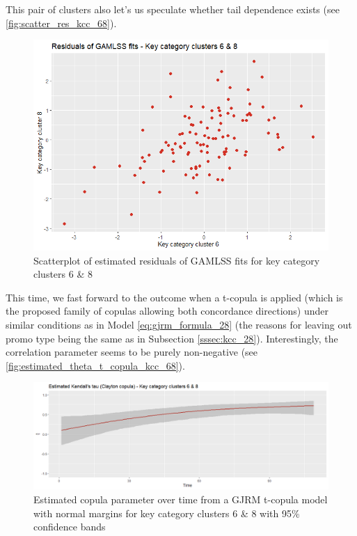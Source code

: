 


This pair of clusters also let's us speculate whether tail dependence exists (see \autoref{fig:scatter_res_kcc_68}).
\\


\begin{figure}[H]
\centering
  \includegraphics[width=0.45\linewidth]{figures/scatter_res_kcc_68.png}
  \caption{Scatterplot of estimated residuals of GAMLSS fits for key category clusters 6 \& 8}
  \label{fig:scatter_res_kcc_68}
\end{figure}


This time, we fast forward to the outcome when a t-copula is applied (which is the proposed family of copulas allowing both concordance directions) under similar conditions as in Model \ref{eq:gjrm_formula_28} (the reasons for leaving out promo type being the same as in Subsection \ref{sssec:kcc_28}). Interestingly, the correlation parameter seems to be purely non-negative
(see \autoref{fig:estimated_theta_t_copula_kcc_68}).
\\


\begin{figure}[H]
\centering
  \includegraphics[width=0.95\linewidth]{figures/estimated_theta_t_copula_kcc_68.png}
  \caption{Estimated copula parameter over time from a \ac{GJRM} t-copula model with normal margins for key category clusters 6 \& 8 with 95\% confidence bands}
  \label{fig:estimated_theta_t_copula_kcc_68}
\end{figure}


